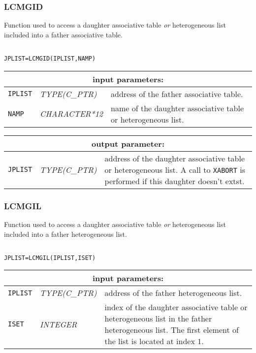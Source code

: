 \subsubsection{LCMGID}

Function used to access a daughter associative table {\sl or} heterogeneous list included into a father associative table. 

\begin{verbatim}

JPLIST=LCMGID(IPLIST,NAMP)
\end{verbatim}

\vskip 0.5cm

\noindent
\begin{tabular}{|p{1.5cm}|p{3cm}|p{10cm}|}
\hline
\multicolumn{3}{|c|}{\bf input parameters:} \\
\hline
{\tt IPLIST} & {\it TYPE(C\_PTR)} & address of the father associative table. \\
\hline
{\tt NAMP} & {\it CHARACTER*12} & name of the daughter associative table or heterogeneous list. \\
\hline
\end{tabular}

\vskip 0.8cm

\noindent
\begin{tabular}{|p{1.5cm}|p{3cm}|p{10cm}|}
\hline
\multicolumn{3}{|c|}{\bf output parameter:} \\
\hline
{\tt JPLIST} & {\it TYPE(C\_PTR)} & address of the daughter associative table or heterogeneous list. A call to {\tt XABORT} is performed if this daughter doesn't extst. \\
\hline
\end{tabular}

\subsubsection{LCMGIL}

Function used to access a daughter associative table {\sl or} heterogeneous list included into a father heterogeneous list. 

\begin{verbatim}

JPLIST=LCMGIL(IPLIST,ISET)
\end{verbatim}

\noindent
\begin{tabular}{|p{1.5cm}|p{3cm}|p{10cm}|}
\hline
\multicolumn{3}{|c|}{\bf input parameters:} \\
\hline
{\tt IPLIST} & {\it TYPE(C\_PTR)} & address of the father heterogeneous list. \\
\hline
{\tt ISET} & {\it INTEGER} & index of the daughter associative table or heterogeneous list in the father heterogeneous list.
The first element of the list is located at index $1$. \\
\hline
\end{tabular}

